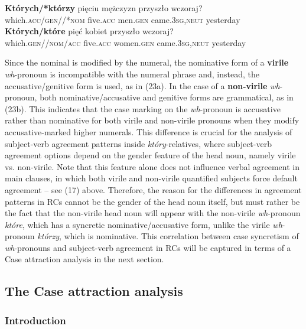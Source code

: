 \documentclass[output=paper]{langsci/langscibook}
\begin{document}
\ea%
    \label{ex:leska:23}
    \ea
    \gll \textbf{Których/*którzy}   pięciu   mężczyzn   przyszło    wczoraj?\\
         which.\textsc{acc/gen//*nom} five.\textsc{acc} men.\textsc{gen}  came.\textsc{3sg,neut} yesterday\\
    \ex
    \gll \textbf{Których/które}  pięć     kobiet   przyszło     wczoraj?\\
         which.\textsc{gen//nom/acc} five.\textsc{acc} women.\textsc{gen}   came.\textsc{3sg,neut} yesterday\\
    \z
\z

Since the nominal is modified by the numeral, the nominative form of a \textbf{virile} \textit{wh}{}-pronoun is incompatible with the numeral phrase and, instead, the accusative\slash genitive form is used, as in (23a). In the case of a \textbf{non-virile} \textit{wh}{}-pronoun, both nominative\slash accusative and genitive forms are grammatical, as in (23b). This indicates that the case marking on the \textit{wh}{}-pronoun is accusative rather than nominative for both virile and non-virile pronouns when they modify accusative-marked higher numerals. This difference is crucial for the analysis of subject-verb agreement patterns inside \textit{który}{}-relatives, where subject-verb agreement options depend on the gender feature of the head noun, namely virile vs. non-virile. Note that this feature alone does not influence verbal agreement in main clauses, in which both virile and non-virile quantified subjects force default agreement – see (17) above. Therefore, the reason for the differences in agreement patterns in RCs cannot be the gender of the head noun itself, but must rather be the fact that the non-virile head noun will appear with the non-virile \textit{wh}{}-pronoun \textit{które}, which has a syncretic nominative/accusative form, unlike the virile \textit{wh}{}-pronoun \textit{którzy}, which is nominative. This correlation between case syncretism of \textit{wh}{}-pronouns and subject-verb agreement in RCs will be captured in terms of a Case attraction analysis in the next section.

\subsection{The Case attraction analysis}%
\subsubsection{Introduction}
\end{document}
